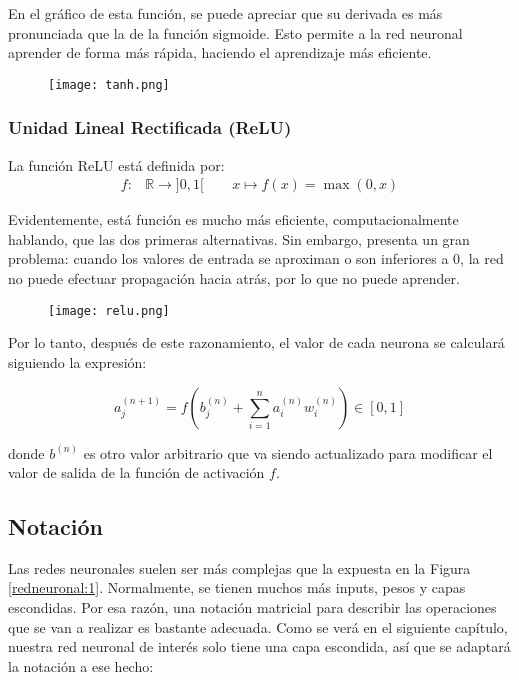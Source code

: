 En el gráfico de esta función, se puede apreciar que su derivada es más pronunciada que la de la función sigmoide. Esto permite a la red neuronal aprender de forma más rápida, haciendo el aprendizaje más eficiente.

\begin{figure}[H]
    \texttt{[image: tanh.png]}
    \centering
\end{figure}

\subsubsection{Unidad Lineal Rectificada (ReLU)}

La función ReLU está definida por:
\begin{align*}
    f \colon & \mathbb{R} \longrightarrow ]0,1[ \
    \quad    & x \longmapsto f(x) = \max(0,x)
\end{align*}

Evidentemente, está función es mucho más eficiente, computacionalmente hablando, que las dos primeras alternativas. Sin embargo, presenta un gran problema: cuando los valores de entrada se aproximan o son inferiores a 0, la red no puede efectuar propagación hacia atrás, por lo que no puede aprender.

\begin{figure}[H]
    \texttt{[image: relu.png]}
    \centering
\end{figure}


Por lo tanto, después de este razonamiento, el valor de cada neurona se calculará siguiendo la expresión:

\begin{equation}
    \label{eqn:1}
    a^{(n+1)}_j = f\left( b^{(n)}_j + \sum_{i=1}^n a^{(n)}_i w^{(n)}_i \right) \in [0,1]
\end{equation}

donde $b^{(n)}$ es otro valor arbitrario que va siendo actualizado para modificar el valor de salida de la
función de activación $f$.

\subsection{Notación}

Las redes neuronales suelen ser más complejas que la expuesta en la Figura \ref{redneuronal:1}. Normalmente,
se tienen muchos más inputs, pesos y capas escondidas. Por esa razón, una notación matricial para describir
las operaciones que se van a realizar es bastante adecuada. Como se verá en el siguiente capítulo, nuestra
red neuronal de interés solo tiene una capa escondida, así que se adaptará la notación a ese hecho:

